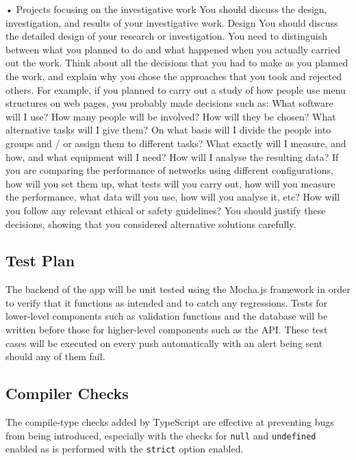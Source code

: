 {    •	Projects focusing on the investigative work
    You should discuss the design, investigation, and results of your investigative work.
    Design
    You should discuss the detailed design of your research or investigation. You need to distinguish between what you planned to do and what happened when you actually
    carried out the work. Think about all the decisions that you had to make as you planned the work, and explain why you chose the approaches that you took and rejected others.
    For example, if you planned to carry out a study of how people use menu structures on web pages, you probably made decisions such as: What software will I use? How many
    people will be involved? How will they be chosen? What alternative tasks will I give them? On what basis will I divide the people into groups and / or assign them
    to different tasks? What exactly will I measure, and how, and what equipment will I need? How will I analyse the resulting data? If you are comparing the performance
    of networks using different configurations, how will you set them up, what tests will you carry out, how will you measure the performance, what data will you use, how
    will you analyse it, etc? How will you follow any relevant ethical or safety guidelines? You should justify these decisions, showing that you considered alternative
    solutions carefully.
}


\subsection{Test Plan}
The backend of the app will be unit tested using the Mocha.js framework in order
to verify that it functions as intended and to catch any regressions. Tests for lower-level components
such as validation functions and the database will be written before those for higher-level
components such as the API. These test cases will be executed on every push automatically
with an alert being sent should any of them fail.

\subsection{Compiler Checks}
The compile-type checks added by TypeScript are effective at preventing bugs from being introduced, especially with
the checks for \texttt{null} and \texttt{undefined} enabled as is performed with the \texttt{strict} option enabled.~\cite{gao_type_2017}


